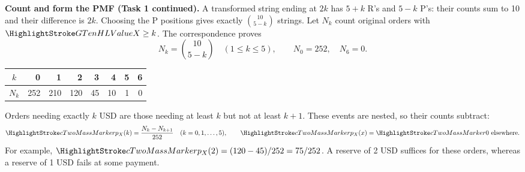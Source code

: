 \textbf{Count and form the PMF (Task 1 continued).} A transformed string ending at $2k$ has $5+k$ R's and $5-k$ P's: their counts sum to 10 and their difference is $2k$. Choosing the P positions gives exactly $\binom{10}{5-k}$ strings. Let $N_k$ count original orders with $\cTwoValue{X}\geq k$. The correspondence proves
\[
N_k=\binom{10}{5-k}\quad(1\leq k\leq5),\qquad N_0=252,\quad N_6=0.
\]
\begin{center}\begin{tabular}{c|rrrrrrr}\toprule
$k$ & 0 & 1 & 2 & 3 & 4 & 5 & 6 \\\midrule
$N_k$ & 252 & 210 & 120 & 45 & 10 & 1 & 0 \\\bottomrule
\end{tabular}\end{center}
Orders needing exactly $k$ USD are those needing at least $k$ but not at least $k+1$. These events are nested, so their counts subtract:
\[
\cTwoMassHL{p_X(k)}=\frac{N_k-N_{k+1}}{252}\quad(k=0,1,\ldots,5),
\qquad \cTwoMassHL{p_X(x)}=\cTwoMassHL{0}\text{ elsewhere}.
\]
For example, $\cTwoMassHL{p_X(2)}=(120-45)/252=75/252$. A reserve of 2 USD suffices for these orders, whereas a reserve of 1 USD fails at some payment.


